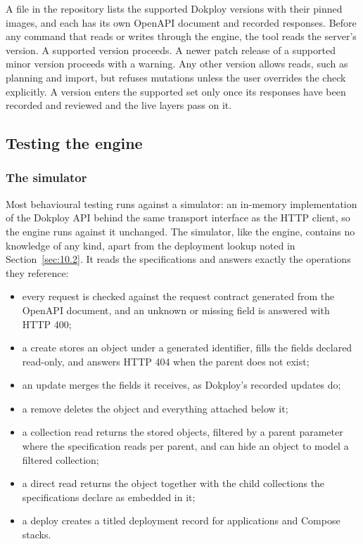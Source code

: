 A file in the repository lists the supported Dokploy versions with their pinned images, and each has
its own OpenAPI document and recorded responses. Before any command that reads or writes through the
engine, the tool reads the server's version. A supported version proceeds. A newer patch release of
a supported minor version proceeds with a warning. Any other version allows reads, such as planning
and import, but refuses mutations unless the user overrides the check explicitly. A version enters the
supported set only once its responses have been recorded and reviewed and the live layers pass on it.

\subsection{Testing the engine}\label{sec:7.2}

\subsubsection*{The simulator}

Most behavioural testing runs against a simulator: an in-memory implementation of the Dokploy API
behind the same transport interface as the HTTP client, so the engine runs against it unchanged. The
simulator, like the engine, contains no knowledge of any kind, apart from the deployment lookup noted
in Section~\ref{sec:10.2}. It reads the specifications and answers
exactly the operations they reference:

\begin{itemize}
\item
  every request is checked against the request contract generated from the OpenAPI document, and an
  unknown or missing field is answered with HTTP 400;
\item
  a create stores an object under a generated identifier, fills the fields declared read-only, and
  answers HTTP 404 when the parent does not exist;
\item
  an update merges the fields it receives, as Dokploy's recorded updates do;
\item
  a remove deletes the object and everything attached below it;
\item
  a collection read returns the stored objects, filtered by a parent parameter where the
  specification reads per parent, and can hide an object to model a filtered collection;
\item
  a direct read returns the object together with the child collections the specifications declare as
  embedded in it;
\item
  a deploy creates a titled deployment record for applications and Compose stacks.
\end{itemize}

